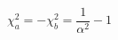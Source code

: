 \begin{equation}
    \chi_a^2 = - \chi_b^2 = \frac{1}{\alpha^2} - 1
    \label{eq:emt_chi}
\end{equation}
